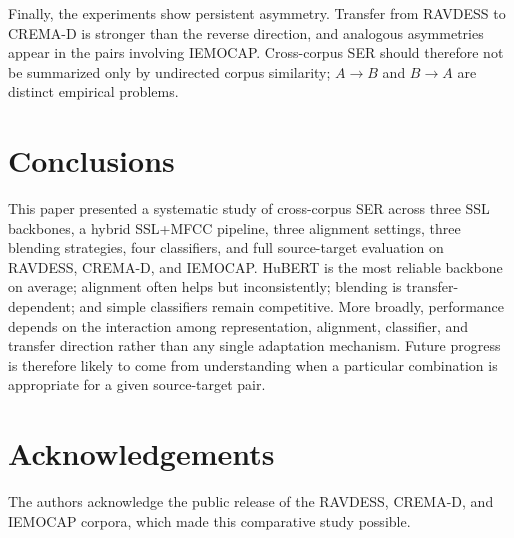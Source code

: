 \documentclass[9pt,twocolumn,letterpaper]{article}
\begin{document}
Finally, the experiments show persistent asymmetry. Transfer from RAVDESS to CREMA-D is stronger than the reverse direction, and analogous asymmetries appear in the pairs involving IEMOCAP. Cross-corpus SER should therefore not be summarized only by undirected corpus similarity; $A \rightarrow B$ and $B \rightarrow A$ are distinct empirical problems.

\section*{Conclusions}
This paper presented a systematic study of cross-corpus SER across three SSL backbones, a hybrid SSL+MFCC pipeline, three alignment settings, three blending strategies, four classifiers, and full source-target evaluation on RAVDESS, CREMA-D, and IEMOCAP. HuBERT is the most reliable backbone on average; alignment often helps but inconsistently; blending is transfer-dependent; and simple classifiers remain competitive. More broadly, performance depends on the interaction among representation, alignment, classifier, and transfer direction rather than any single adaptation mechanism. Future progress is therefore likely to come from understanding when a particular combination is appropriate for a given source-target pair.

\section*{Acknowledgements}
The authors acknowledge the public release of the RAVDESS, CREMA-D, and IEMOCAP corpora, which made this comparative study possible.
\end{document}
